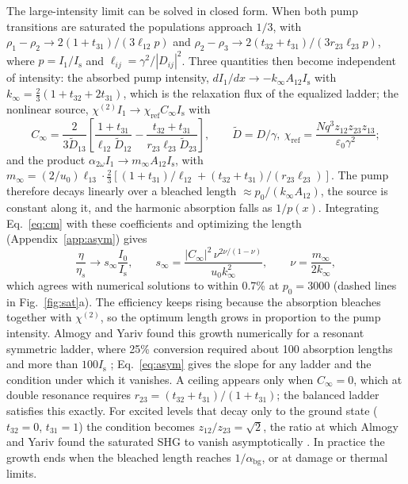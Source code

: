 \documentclass[11pt]{article}
\newcommand{\chitwo}{\chi^{(2)}}
\newcommand{\aww}{\alpha_{2\omega}}
\newcommand{\Is}{I_\mathrm{s}}
\begin{document}
The large-intensity limit can be solved in closed form. When both pump transitions are saturated the populations approach $1/3$, with $\rho_1-\rho_2\to2(1+t_{31})/(3\ell_{12}p)$ and $\rho_2-\rho_3\to2(t_{32}+t_{31})/(3r_{23}\ell_{23}p)$, where $p=I_1/\Is$ and $\ell_{ij}=\gamma^2/|D_{ij}|^2$. Three quantities then become independent of intensity: the absorbed pump intensity, $dI_1/dx\to-k_\infty A_{12}\Is$ with $k_\infty=\tfrac23(1+t_{32}+2t_{31})$, which is the relaxation flux of the equalized ladder; the nonlinear source, $\chitwo I_1\to\chi_\mathrm{ref}C_\infty\Is$ with
\begin{equation}
C_\infty=\frac{2}{3\tilde D_{13}}\left[\frac{1+t_{31}}{\ell_{12}\tilde D_{12}}-\frac{t_{32}+t_{31}}{r_{23}\ell_{23}\tilde D_{23}}\right],\qquad \tilde D=D/\gamma,\ \chi_\mathrm{ref}=\frac{Nq^3z_{12}z_{23}z_{13}}{\varepsilon_0\gamma^2};\label{eq:Cinf}
\end{equation}
and the product $\aww I_1\to m_\infty A_{12}\Is$, with $m_\infty=(2/u_0)\ell_{13}\cdot\tfrac23[(1+t_{31})/\ell_{12}+(t_{32}+t_{31})/(r_{23}\ell_{23})]$. The pump therefore decays linearly over a bleached length $\approx p_0/(k_\infty A_{12})$, the source is constant along it, and the harmonic absorption falls as $1/p(x)$. Integrating Eq.~\eqref{eq:cm} with these coefficients and optimizing the length (Appendix~\ref{app:asym}) gives
\begin{equation}
\frac{\eta}{\eta_s}\to s_\infty\frac{I_0}{\Is},\qquad s_\infty=\frac{|C_\infty|^2\,\nu^{2\nu/(1-\nu)}}{u_0k_\infty^2},\qquad\nu=\frac{m_\infty}{2k_\infty},\label{eq:asym}
\end{equation}
which agrees with numerical solutions to within 0.7\% at $p_0=3000$ (dashed lines in Fig.~\ref{fig:sat}a). The efficiency keeps rising because the absorption bleaches together with $\chitwo$, so the optimum length grows in proportion to the pump intensity. Almogy and Yariv found this growth numerically for a resonant symmetric ladder, where 25\% conversion required about 100 absorption lengths and more than $100\Is$ \cite[Fig.~9.6]{AlmogyThesis1995}; Eq.~\eqref{eq:asym} gives the slope for any ladder and the condition under which it vanishes. A ceiling appears only when $C_\infty=0$, which at double resonance requires $r_{23}=(t_{32}+t_{31})/(1+t_{31})$; the balanced ladder satisfies this exactly. For excited levels that decay only to the ground state ($t_{32}=0$, $t_{31}=1$) the condition becomes $z_{12}/z_{23}=\sqrt2$, the ratio at which Almogy and Yariv found the saturated SHG to vanish asymptotically \cite{AlmogyLEOS1994}. In practice the growth ends when the bleached length reaches $1/\alpha_\mathrm{bg}$, or at damage or thermal limits.
\end{document}
